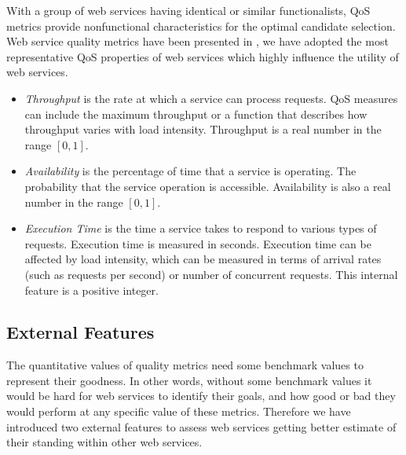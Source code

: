 \documentclass[10pt,journal,cspaper,compsoc]{IEEEtran}
\begin{document}
With a group of web services having identical or similar functionalists, QoS metrics provide nonfunctional characteristics for the optimal candidate selection. Web service quality metrics have been presented in \cite{Ardagna:2007:ASC:1263152.1263531,Menasce:2002:QIW:613357.613758,10.1109/ISSRE.2011.17}, we have adopted the most representative QoS properties of web services which highly influence the utility of web services.

\begin{itemize}

  \item \emph{Throughput} is the rate at which a service can process requests. QoS measures can include the maximum throughput or a function that describes how throughput varies with load intensity. Throughput is a real number in the range $[0, 1]$.
	
	\item \emph{Availability} is the percentage of time that a service is operating.
	The probability that the service operation is accessible. Availability is also a real number in the range $[0, 1]$.
	
	\item \emph{Execution Time} is the time a service takes to respond to various types of requests. 
	Execution time is measured in seconds. Execution time can be affected by load intensity, which can be measured in terms of arrival rates (such as requests per second) or number of concurrent requests. This internal feature is a positive integer. 
	
	
\end{itemize}


\subsection{External Features}\label{s:ef}

The quantitative values of quality metrics need some benchmark values to represent their goodness. In other words, without some benchmark values it would be hard for web services to identify their goals, and how good or bad they would perform at any specific value of these metrics. Therefore we have introduced two external features to assess web services getting better estimate of their standing within other web services.
\end{document}
